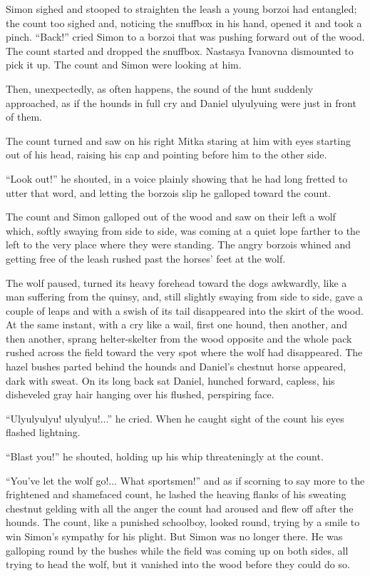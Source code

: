 Simon sighed and stooped to straighten the leash a young borzoi
had entangled; the count too sighed and, noticing the snuffbox in
his hand, opened it and took a pinch. ``Back!'' cried Simon to a
borzoi that was pushing forward out of the wood. The count
started and dropped the snuffbox. Nastasya Ivanovna dismounted to
pick it up. The count and Simon were looking at him.

Then, unexpectedly, as often happens, the sound of the hunt
suddenly approached, as if the hounds in full cry and Daniel
ulyulyuing were just in front of them.

The count turned and saw on his right Mitka staring at him with
eyes starting out of his head, raising his cap and pointing
before him to the other side.

``Look out!'' he shouted, in a voice plainly showing that he had
long fretted to utter that word, and letting the borzois slip he
galloped toward the count.

The count and Simon galloped out of the wood and saw on their
left a wolf which, softly swaying from side to side, was coming
at a quiet lope farther to the left to the very place where they
were standing. The angry borzois whined and getting free of the
leash rushed past the horses' feet at the wolf.

The wolf paused, turned its heavy forehead toward the dogs
awkwardly, like a man suffering from the quinsy, and, still
slightly swaying from side to side, gave a couple of leaps and
with a swish of its tail disappeared into the skirt of the
wood. At the same instant, with a cry like a wail, first one
hound, then another, and then another, sprang helter-skelter from
the wood opposite and the whole pack rushed across the field
toward the very spot where the wolf had disappeared. The hazel
bushes parted behind the hounds and Daniel's chestnut horse
appeared, dark with sweat. On its long back sat Daniel, hunched
forward, capless, his disheveled gray hair hanging over his
flushed, perspiring face.

``Ulyulyulyu! ulyulyu!...'' he cried. When he caught sight of the
count his eyes flashed lightning.

``Blast you!'' he shouted, holding up his whip threateningly at
the count.

``You've let the wolf go!... What sportsmen!'' and as if scorning
to say more to the frightened and shamefaced count, he lashed the
heaving flanks of his sweating chestnut gelding with all the
anger the count had aroused and flew off after the hounds. The
count, like a punished schoolboy, looked round, trying by a smile
to win Simon's sympathy for his plight. But Simon was no longer
there. He was galloping round by the bushes while the field was
coming up on both sides, all trying to head the wolf, but it
vanished into the wood before they could do so.

